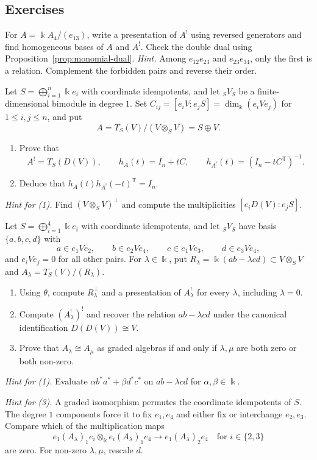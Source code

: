 \subsection{Exercises}

\begin{exercise}
For $A=\Bbbk A_4/(e_{13})$, write a presentation of $A^!$ using reversed generators and find homogeneous bases of $A$ and $A^!$.
Check the double dual using Proposition~\ref{prop:monomial-dual}.
\emph{Hint.} Among $e_{12}e_{23}$ and $e_{23}e_{34}$, only the first is a relation. Complement the forbidden pairs and reverse their order.
\end{exercise}

\begin{exercise}
Let $S=\bigoplus_{i=1}^n\Bbbk e_i$ with coordinate idempotents, and let ${}_SV_S$ be a finite-dimensional bimodule in degree $1$.
Set $C_{ij}=[e_iV:e_jS]=\dim_\Bbbk(e_iVe_j)$ for $1\leq i,j\leq n$, and put
\[
A=T_S(V)/(V\otimes_S V)=S\oplus V.
\]
\begin{enumerate}
\item Prove that
\[
A^!=T_S(D(V)),\qquad h_A(t)=I_n+tC,\qquad
h_{A^!}(t)=(I_n-tC^{\mathsf T})^{-1}.
\]
\item Deduce that $h_A(t)h_{A^!}(-t)^{\mathsf T}=I_n$.
\end{enumerate}
\emph{Hint for (1).} Find $(V\otimes_S V)^\perp$ and compute the multiplicities $[e_iD(V):e_jS]$.
\end{exercise}

\begin{advanced}
\begin{exercise}
Let $S=\bigoplus_{i=1}^4\Bbbk e_i$ with coordinate idempotents, and let ${}_SV_S$ have basis $\{a,b,c,d\}$ with
\[
a\in e_1Ve_2,\qquad b\in e_2Ve_4,\qquad
c\in e_1Ve_3,\qquad d\in e_3Ve_4,
\]
and $e_iVe_j=0$ for all other pairs.
For $\lambda\in\Bbbk$, put $R_\lambda=\Bbbk(ab-\lambda cd)\subset V\otimes_S V$ and $A_\lambda=T_S(V)/(R_\lambda)$.
\begin{enumerate}
\item Using $\theta$, compute $R_\lambda^\perp$ and a presentation of $A_\lambda^!$ for every $\lambda$, including $\lambda=0$.
\item Compute $(A_\lambda^!)^!$ and recover the relation $ab-\lambda cd$ under the canonical identification $D(D(V))\cong V$.
\item Prove that $A_\lambda\cong A_\mu$ as graded algebras if and only if $\lambda,\mu$ are both zero or both non-zero.
\end{enumerate}

\emph{Hint for (1).} Evaluate $\alpha b^*a^*+\beta d^*c^*$ on $ab-\lambda cd$ for $\alpha,\beta\in\Bbbk$.

\emph{Hint for (3).} A graded isomorphism permutes the coordinate idempotents of $S$.
The degree $1$ components force it to fix $e_1,e_4$ and either fix or interchange $e_2,e_3$.
Compare which of the multiplication maps
\[
e_1(A_\lambda)_1e_i\otimes_\Bbbk e_i(A_\lambda)_1e_4
\longrightarrow e_1(A_\lambda)_2e_4
\quad\text{for }i\in\{2,3\}
\]
are zero. For non-zero $\lambda,\mu$, rescale $d$.
\end{exercise}
\end{advanced}

